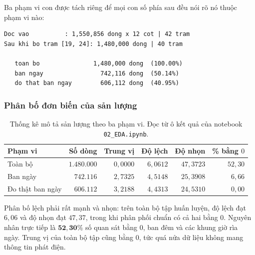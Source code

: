 \documentclass[12pt, a4paper]{report}
\begin{document}
Ba phạm vi con được tách riêng để mọi con số phía sau đều nói rõ nó thuộc phạm vi nào:

\begingroup
\par{}\vspace{8pt}
\small\renewcommand{\baselinestretch}{1.0}\selectfont
\begin{verbatim}
Doc vao          : 1,550,856 dong x 12 cot | 42 tram
Sau khi bo tram [19, 24]: 1,480,000 dong | 40 tram

   toan bo               1,480,000 dong  (100.00%)
   ban ngay                742,116 dong  (50.14%)
   do that ban ngay        606,112 dong  (40.95%)
\end{verbatim}
\par\vspace{8pt}
\endgroup
\subsubsection{Phân bố đơn biến của sản lượng}

\begin{table}[htbp]
\centering
\caption{Thống kê mô tả sản lượng theo ba phạm vi. Đọc từ ô kết quả của notebook
\texttt{02\_EDA.ipynb}.}
\label{tab:eda_mo_ta}
\small
\begin{tabular}{l r r r r r}
\toprule
\textbf{Phạm vi} & \textbf{Số dòng} & \textbf{Trung vị} & \textbf{Độ lệch} & \textbf{Độ nhọn} & \textbf{\% bằng $0$} \\
\midrule
Toàn bộ          & $1.480.000$ & $0{,}0000$ & $6{,}0612$ & $47{,}3723$ & $52{,}30$ \\
Ban ngày         & $742.116$   & $2{,}7325$ & $4{,}5148$ & $25{,}3908$ & $6{,}66$ \\
Đo thật ban ngày & $606.112$   & $3{,}2188$ & $4{,}4313$ & $24{,}5310$ & $0{,}00$ \\
\bottomrule
\end{tabular}
\caption[Thống kê mô tả sản lượng theo ba phạm vi]{Thống kê mô tả sản lượng theo ba phạm vi. Đọc từ ô kết quả của notebook
\texttt{02\_EDA.ipynb}.}
\label{tab:eda_mo_ta}
\end{table}

Phân bố lệch phải rất mạnh và nhọn: trên toàn bộ tập huấn luyện, độ lệch đạt $6{,}06$ và độ
nhọn đạt $47{,}37$, trong khi phân phối chuẩn có cả hai bằng $0$. Nguyên nhân trực tiếp là
$\mathbf{52{,}30\%}$ số quan sát bằng $0$, ban đêm và các khung giờ rìa ngày. Trung vị của
toàn bộ tập cũng bằng $0$, tức quá nửa dữ liệu không mang thông tin phát điện.
\end{document}
